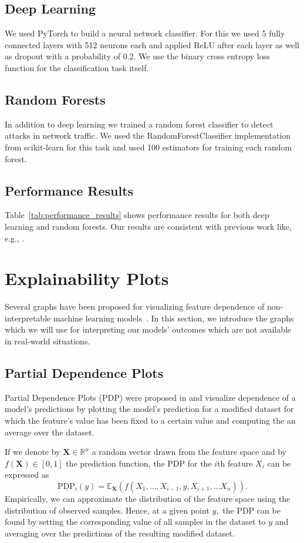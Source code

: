 \documentclass[10pt,sigconf,letterpaper]{acmart}
\begin{document}
\subsection{Deep Learning}
We used PyTorch to build a neural network classifier. For this we used 5 fully connected layers with 512 neurons each and applied ReLU after each layer as well as dropout with a probability of 0.2. We use the binary cross entropy loss function for the classification task itself. 

\subsection{Random Forests}
In addition to deep learning we trained a random forest classifier to detect attacks in network traffic. We used the RandomForestClassifier implementation from scikit-learn for this task and used 100 estimators for training each random forest.


\subsection{Performance Results}
Table~\ref{tab:performance_results} shows performance results for both deep learning and random forests. Our results are consistent with previous work like, e.g., \cite{fares}.



\section{Explainability Plots} \label{sec:plots}
Several graphs have been proposed for visualizing feature dependence of non-interpretable machine learning models~\cite{goldstein2015peeking, friedman2001greedy, apley2016visualizing}.
In this section, we introduce the graphs which we will use for interpreting our models' outcomes which are not available in real-world situations.
\subsection{Partial Dependence Plots}
Partial Dependence Plots (PDP) were proposed in \cite{friedman2001greedy} and visualize dependence of a model's predictions by plotting the model's prediction for a modified dataset for which the feature's value has been fixed to a certain value and computing the an average over the dataset.

If we denote by $\boldsymbol X \in \mathbb R ^n$ a random vector drawn from the feature space and by $f(\boldsymbol X) \in [0,1]$ the  prediction function, the PDP for the $i$th feature $X_i$ can be expressed as
\begin{equation}
\text{PDP}_i(y) = \mathbb E_{\boldsymbol X}\left(f(X_1,\ldots,X_{i-1},y,X_{i+1},\ldots X_n)\right) . %
\end{equation}
Empirically, we can approximate the distribution of the feature space using the distribution of observed samples. Hence, at a given point $y,$ the PDP can be found by setting the corresponding value of all samples in the dataset to $y$ and averaging over the predictions of the resulting modified dataset.
\end{document}
